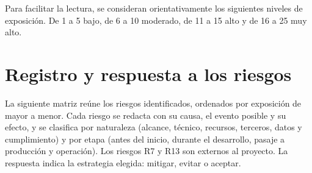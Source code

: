 Para facilitar la lectura, se consideran orientativamente los siguientes niveles de exposición. De 1 a 5 bajo, de 6 a 10 moderado, de 11 a 15 alto y de 16 a 25 muy alto.

\section{Registro y respuesta a los riesgos}

La siguiente matriz reúne los riesgos identificados, ordenados por exposición de mayor a menor. Cada riesgo se redacta con su causa, el evento posible y su efecto, y se clasifica por naturaleza (alcance, técnico, recursos, terceros, datos y cumplimiento) y por etapa (antes del inicio, durante el desarrollo, pasaje a producción y operación). Los riesgos R7 y R13 son externos al proyecto. La respuesta indica la estrategia elegida: mitigar, evitar o aceptar.

